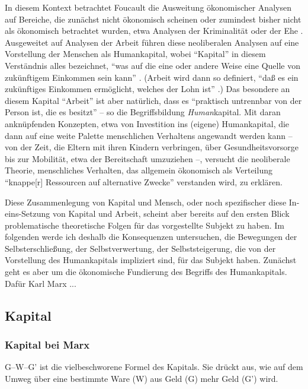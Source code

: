\documentclass[12pt,
               DIV13,
               paper=a4,
               twoside=false,
               onehalfspacing,
               bibliography=totoc,
               toc=graduated,
               draft,
               ]{scrartcl}
\newcommand{\pc}[2]{\parencite[#1]{#2}}
\newcommand{\vgl}[2]{\parencite[vgl.][#1]{#2}}
\newcommand{\worries}[1]{\ifdraft{\textcolor{blue}{\texttt{(#1)}}}{}}
\newcommand{\gwg}{G--W--G'\xspace}
\begin{document}
In diesem Kontext betrachtet Foucault die Ausweitung ökonomischer
Analysen auf Bereiche, die zunächst nicht ökonomisch scheinen oder
zumindest bisher nicht als ökonomisch betrachtet wurden, etwa Analysen
der Kriminalität oder der Ehe \vgl{367}{gbp}. Ausgeweitet auf Analysen
der Arbeit führen diese neoliberalen Analysen auf eine Vorstellung der
Menschen als Humankapital, wobei "`Kapital"' in diesem Verständnis
alles bezeichnet, "`was auf die eine oder andere Weise eine Quelle von
zukünftigem Einkommen sein kann"' \pc{312}{gbp}. (Arbeit wird dann so
definiert, "`daß es ein zukünftiges Einkommen ermöglicht, welches der
Lohn ist"' \pc{312}{gbp}.) Das besondere an diesem Kapital "`Arbeit"'
ist aber natürlich, dass es "`praktisch untrennbar von der Person ist,
die es besitzt"' \pc{312}{gbp} -- so die Begriffsbildung
\emph{Human}kapital. Mit daran anknüpfenden Konzepten, etwa von
Investition ins (eigene) Humankapital, die dann auf eine weite Palette
menschlichen Verhaltens angewandt werden kann -- von der Zeit, die
Eltern mit ihren Kindern verbringen, über Gesundheitsvorsorge bis zur
Mobilität, etwa der Bereitschaft umzuziehen \vgl{320}{gbp} --,
versucht die neoliberale Theorie, menschliches Verhalten, das
allgemein ökonomisch als Verteilung "`knappe[r] Ressourcen auf
alternative Zwecke"' \pc{310}{gbp} verstanden wird, zu erklären.

Diese Zusammenlegung von Kapital und Mensch, oder noch spezifischer
diese In-eins-Set\-zung von Kapital und Arbeit, scheint aber bereits
auf den ersten Blick problematische theoretische \worries{und
praktische?} Folgen für das vorgestellte Subjekt zu haben. Im
folgenden werde ich deshalb die Konsequenzen untersuchen, die
Bewegungen der Selbsterschließung, der Selbstverwertung, der
Selbststeigerung, die von der Vorstellung des Humankapitals impliziert
sind, für das Subjekt haben. Zunächst geht es aber um die ökonomische
Fundierung des Begriffs des Humankapitals. Dafür Karl Marx ...

\worries{Warum Marx?}

\subsection{Kapital}

\subsubsection{Kapital bei Marx}

\gwg ist die vielbeschworene Formel des Kapitals. Sie drückt aus, wie
auf dem Umweg über eine bestimmte Ware (W) aus Geld (G) mehr Geld (G')
wird.
\end{document}
